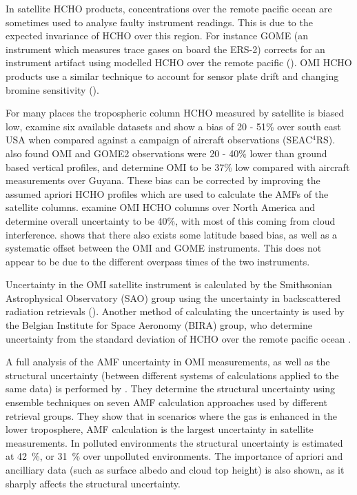       In satellite HCHO products, concentrations over the remote pacific ocean are sometimes used to analyse faulty instrument readings.
      This is due to the expected invariance of HCHO over this region.
      For instance GOME (an instrument which measures trace gases on board the ERS-2) corrects for an instrument artifact using modelled HCHO over the remote pacific (\textcite{Shim2005}).
      OMI HCHO products use a similar technique to account for sensor plate drift and changing bromine sensitivity (\textcite{Abad2015}).
      
      
      
      For many places the tropospheric column HCHO measured by satellite is biased low, \textcite{Zhu2016} examine six available datasets and show a bias of 20 - 51\% over south east USA when compared against a campaign of aircraft observations (SEAC$^4$RS).
      \textcite{DeSmedt2015} also found OMI and GOME2 observations were 20 - 40\% lower than ground based vertical profiles, and \textcite{Barkley2013} determine OMI to be 37\% low compared with aircraft measurements over Guyana.
      These bias can be corrected by improving the assumed apriori HCHO profiles which are used to calculate the AMFs of the satellite columns.
      \textcite{Millet2006} examine OMI HCHO columns over North America and determine overall uncertainty to be 40\%, with most of this coming from cloud interference.
      \textcite{Millet2008} shows that there also exists some latitude based bias, as well as a systematic offset between the OMI and GOME instruments.
      This does not appear to be due to the different overpass times of the two instruments.
      
      Uncertainty in the OMI satellite instrument is calculated by the Smithsonian Astrophysical Observatory (SAO) group using the uncertainty in backscattered radiation retrievals (\textcite{Abad2015, Abad2016}).
      Another method of calculating the uncertainty is used by the Belgian Institute for Space Aeronomy (BIRA) group, who determine uncertainty from the standard deviation of HCHO over the remote pacific ocean \parencite{DeSmedt2012, DeSmedt2015}.
      
      A full analysis of the AMF uncertainty in OMI measurements, as well as the structural uncertainty (between different systems of calculations applied to the same data) is performed by \textcite{Lorente2017}.
      They determine the structural uncertainty using ensemble techniques on seven AMF calculation approaches used by different retrieval groups.
      They show that in scenarios where the gas is enhanced in the lower troposphere, AMF calculation is the largest uncertainty in satellite measurements.
      In polluted environments the structural uncertainty is estimated at 42~\%, or 31~\% over unpolluted environments.
      The importance of apriori and ancilliary data (such as surface albedo and cloud top height) is also shown, as it sharply affects the structural uncertainty.
      
